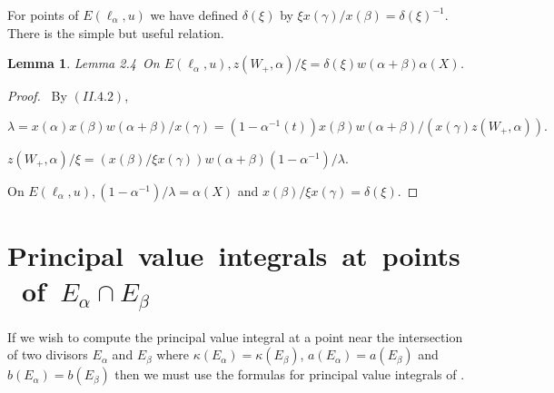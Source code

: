 \documentclass{memo-l}
\newtheorem{lemma}[theorem]{Lemma}
\theoremstyle{definition}
\theoremstyle{remark}
\numberwithin{section}{chapter}
\numberwithin{equation}{chapter}
\begin{document}
   For points of $E({\ell}_{{\alpha}},u)$ we have defined ${\delta}({\xi})$
by ${\xi}x({\gamma})/x({\beta})  =  {\delta}({\xi})^{-1}$.  There is the
simple but useful relation.

\begin{lemma}{Lemma 2.4}\ On $E({\ell}_{{\alpha}},u),
z(W_{+},{\alpha})/{\xi}  =  {\delta}({\xi})w({\alpha}+{\beta}){\alpha}(X)$.
\end{lemma}

\begin{proof} \ By $(II.4.2)$,

$${\lambda}  =  x({\alpha})x({\beta})w({\alpha}+{\beta})/x({\gamma})  =
(1-{\alpha}^{-1}(t))x({\beta})w({\alpha}+{\beta})/(x({\gamma})z(W_{+},{\alpha})).$$

$z(W_{+},{\alpha})/{\xi}  =
(x({\beta})/{\xi}x({\gamma}))w({\alpha}+{\beta})(1-{\alpha}^{-1})/{\lambda}$.

\medskip
On $E({\ell}_{{\alpha}},u), (1-{\alpha}^{-1})/{\lambda}  =  {\alpha}(X)$ and
$x({\beta})/{\xi}x({\gamma})  =  {\delta}({\xi})$.
\end{proof}


\section{Principal\ value\ integrals\ at\ points\ of\
$E_{{\alpha}} \cap E_\beta$}


   If we wish to compute the principal value integral at a point near the
intersection of two divisors $E_{{\alpha}}$ and $E_{{\beta}}$ where
${\kappa}(E_{{\alpha}})  =  {\kappa}(E_{{\beta}})$, $a(E_{{\alpha}})  =
a(E_{{\beta}})$ and $b(E_{{\alpha}})  =  b(E_{{\beta}})$ then we must use the
formulas for principal value integrals of \cite{MR701566}.
\end{document}
